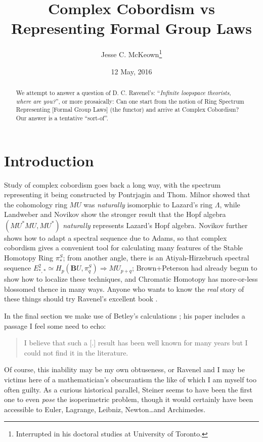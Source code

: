 \documentclass{article}
\title{Complex Cobordism vs Representing Formal Group Laws}
\author{Jesse C. McKeown\footnote{Interrupted in his doctoral studies at University of Toronto.}}
\date{12 May, 2016}
\newcommand{\6}{\partial}
\newcommand{\8}{\infty}
\begin{document}

\maketitle

\begin{abstract}
We attempt to answer a question of D. C. Ravenel's:
``\textit{Infinite loopspace theorists, where are you?}'', or more prosaically:
 Can one start from the notion of Ring Spectrum Representing [Formal Group Laws] (the functor) and arrive at Complex Cobordism?
 Our answer is a tentative ``sort-of''.
\end{abstract}

\newtheorem{theorem}{Theorem}
\newtheorem{cor}[theorem]{Corrolary}
\newtheorem{lemma}[theorem]{Lemma}
\newtheorem{example}{Example}
\newcommand{\mg}{\mathcal{G}}
\newcommand{\Th}{\rlap{\rule{1pt}{0pt}\rule[.6ex]{.6em}{.4pt}}\mathrm{Th}}
\newcommand{\deloop}{\mathbf{B}}

\section{Introduction}
Study of complex cobordism goes back a long way, with the spectrum representing it being constructed by Pontrjagin and Thom.  Milnor showed that the cohomology ring $MU$ was {\em naturally} isomorphic to Lazard's ring $\Lambda$, while Landweber \cite{landweber} and Novikov \cite{novikov} show the stronger result that the Hopf algebra $(MU^*MU,MU^*)$ {\em naturally} represents Lazard's Hopf algebra.  Novikov further shows how to adapt a spectral sequence due to Adams, so that  complex cobordism gives a convenient tool for calculating many features of the Stable Homotopy Ring $\pi^S_*$; from another angle, there is an Atiyah-Hirzebruch spectral sequence $E^2_{*,*}\simeq H_p(\deloop U,\pi^S_q)\Rightarrow MU_{p+q}$; Brown+Peterson had already begun to show how to localize these techniques, and Chromatic Homotopy has more-or-less blossomed thence in many ways.  Anyone who wants to know the {\em real} story of these things should try Ravenel's excellent book \cite{ravenel}.

In the final section we make use of Betley's calculations \cite{betley}; his paper includes a passage I feel some need to echo:
\begin{quotation}
\noindent I believe that such a [.] result has been well known for many years but I could not find it in the literature.
\end{quotation}
Of course, this inability may be my own obtuseness, or Ravenel and I may be victims here of a mathematician's obscurantism the like of which I am myself too often guilty.  As a curious historical parallel, Steiner seems to have been the first one to even {\em pose} the isoperimetric problem, though it would certainly have been accessible to Euler, Lagrange, Leibniz, Newton\dots and Archimedes.
\end{document}
